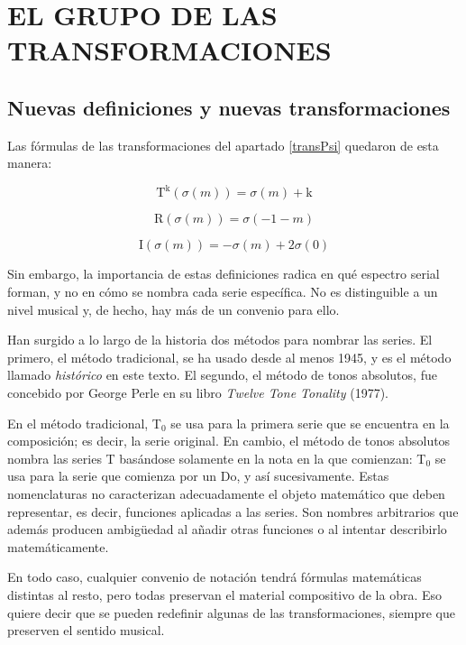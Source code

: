 \chapter{EL GRUPO DE LAS TRANSFORMACIONES}
	\section{Nuevas definiciones y nuevas transformaciones}
		\label{ciclico}
		Las fórmulas de las transformaciones del apartado \ref{transPsi} quedaron de esta manera:
		\vspace{-0.9cm}
		\begin{multicols}{3}
			\[\text{T}^\text{k}(\sigma(m)) = \sigma(m) + \text{k}\]
			
			\[\text{R}(\sigma(m)) = \sigma(-1-m)\]
			
			\[\text{I}(\sigma(m)) = -\sigma(m) + 2\sigma(0)\]
		\end{multicols} \vspace{-0.3cm}
		
		Sin embargo, la importancia de estas definiciones radica en qué espectro serial forman, y no en cómo se nombra cada serie específica. No es distinguible a un nivel musical y, de hecho, hay más de un convenio para ello.
		
		Han surgido a lo largo de la historia dos métodos para nombrar las series. El primero, el método tradicional, se ha usado desde al menos 1945, y es el método llamado \textit{histórico} en este texto. El segundo, el método de tonos absolutos, fue concebido por George Perle en su libro \emph{Twelve Tone Tonality} (1977).
		
		En el método tradicional, T$_0$ se usa para la primera serie que se encuentra en la composición; es decir, la serie original. En cambio, el método de tonos absolutos nombra las series T basándose solamente en la nota en la que comienzan: T$_0$ se usa para la serie que comienza por un Do, y así sucesivamente. Estas nomenclaturas no caracterizan adecuadamente el objeto matemático que deben representar, es decir, funciones aplicadas a las series. Son nombres arbitrarios que además producen ambigüedad al añadir otras funciones o al intentar describirlo matemáticamente.
		
		En todo caso, cualquier convenio de notación tendrá fórmulas matemáticas distintas al resto, pero todas preservan el material compositivo de la obra. Eso quiere decir que se pueden redefinir algunas de las transformaciones, siempre que preserven el sentido musical. 
		

